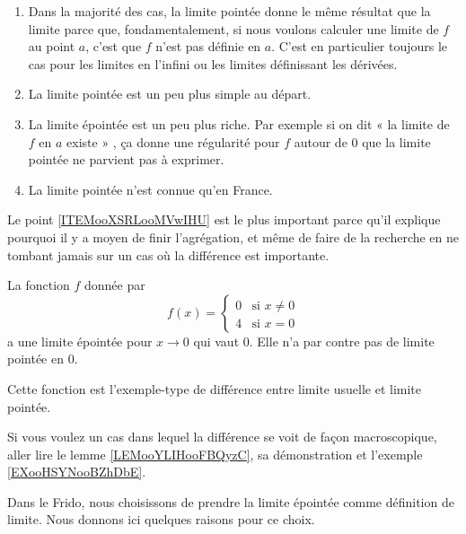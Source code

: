 \begin{enumerate}
    \item       \label{ITEMooXSRLooMVwIHU}
        Dans la majorité des cas, la limite pointée donne le même résultat que la limite parce que, fondamentalement, si nous voulons calculer une limite de \( f\) au point \( a\), c'est que \( f\) n'est pas définie en \( a\). C'est en particulier toujours le cas pour les limites en l'infini ou les limites définissant les dérivées.
    \item
        La limite pointée est un peu plus simple au départ.
    \item
        La limite épointée est un peu plus riche. Par exemple si on dit « la limite de \( f\) en \( a\) existe » , ça donne une régularité pour \( f\) autour de \( 0\) que la limite pointée ne parvient pas à exprimer.
    \item
        La limite pointée n'est connue qu'en France.
\end{enumerate}

Le point \ref{ITEMooXSRLooMVwIHU} est le plus important parce qu'il explique pourquoi il y a moyen de finir l'agrégation, et même de faire de la recherche en ne tombant jamais sur un cas où la différence est importante.

\begin{example}
    La fonction \( f\) donnée par
    \begin{equation}
        f(x)=\begin{cases}
            0    &   \text{si } x\neq 0\\
            4    &    \text{si }x=0
        \end{cases}
    \end{equation}
    a une limite épointée pour \( x\to 0\) qui vaut \( 0\). Elle n'a par contre pas de limite pointée en \( 0\).

    Cette fonction est l'exemple-type de différence entre limite usuelle et limite pointée.
\end{example}

\begin{example}
    Si vous voulez un cas dans lequel la différence se voit de façon macroscopique, aller lire le lemme \ref{LEMooYLIHooFBQyzC}, sa démonstration et l'exemple \ref{EXooHSYNooBZhDbE}.
\end{example}

Dans le Frido, nous choisissons de prendre la limite épointée comme définition de limite. Nous donnons ici quelques raisons pour ce choix.

